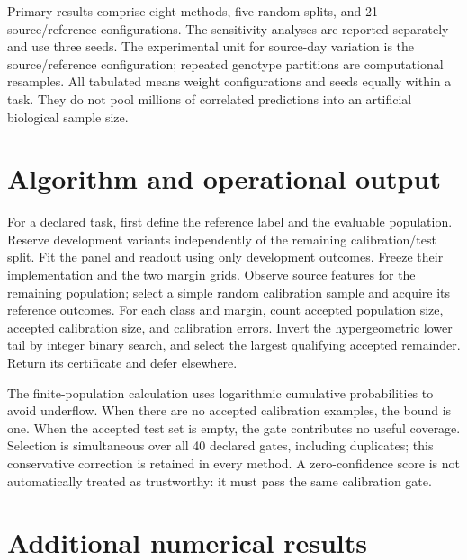\documentclass[11pt,letterpaper]{article}
\begin{document}
\VerificationText

Primary results comprise eight methods, five random splits, and 21 source/reference configurations. The sensitivity analyses are reported separately and use three seeds. The experimental unit for source-day variation is the source/reference configuration; repeated genotype partitions are computational resamples. All tabulated means weight configurations and seeds equally within a task. They do not pool millions of correlated predictions into an artificial biological sample size.

\section{Algorithm and operational output}
For a declared task, first define the reference label and the evaluable population. Reserve development variants independently of the remaining calibration/test split. Fit the panel and readout using only development outcomes. Freeze their implementation and the two margin grids. Observe source features for the remaining population; select a simple random calibration sample and acquire its reference outcomes. For each class and margin, count accepted population size, accepted calibration size, and calibration errors. Invert the hypergeometric lower tail by integer binary search, and select the largest qualifying accepted remainder. Return its certificate and defer elsewhere.

The finite-population calculation uses logarithmic cumulative probabilities to avoid underflow. When there are no accepted calibration examples, the bound is one. When the accepted test set is empty, the gate contributes no useful coverage. Selection is simultaneous over all 40 declared gates, including duplicates; this conservative correction is retained in every method. A zero-confidence score is not automatically treated as trustworthy: it must pass the same calibration gate.

\section{Additional numerical results}

\end{document}
